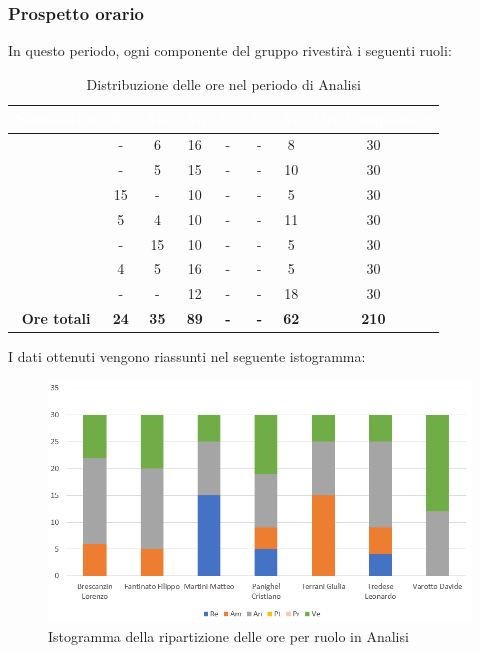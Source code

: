 \subsubsection{Prospetto orario}
In questo periodo, ogni componente del gruppo rivestirà i seguenti ruoli:
\begin{table}[H]
	\begin{center}
		\begin{tabular}{ |c c c c c c c c|}
		\rowcolor{darkblue} 
		\textcolor{white}{\textbf{Nominativo}} & \textcolor{white}{\textbf{Re}} & \textcolor{white}{\textbf{Am}} & \textcolor{white}{\textbf{An}} & \textcolor{white}{\textbf{Pt}} & \textcolor{white}{\textbf{Pr}} & \textcolor{white}{\textbf{Ve}} & \textcolor{white}{\textbf{Ore Complessive}} \\ \hline
		\BL 	& - 	& 6 	& 16 	& - 	& - 	& 8 	& 30 \\ \hline
		\FF 	& - 	& 5 	& 15 	& - 	& - 	& 10 	& 30 \\ \hline
		\MM		& 15	& - 	& 10 	& - 	& - 	& 5 	& 30 \\ \hline
		\PC		& 5 	& 4 	& 10 	& - 	& - 	& 11	& 30 \\ \hline
		\TG 	& - 	& 15	& 10 	& - 	& - 	& 5 	& 30 \\ \hline
		\TL 	& 4 	& 5 	& 16 	& - 	& - 	& 5 	& 30 \\ \hline
		\VD 	& - 	& -  	& 12 	& - 	& - 	& 18 	& 30 \\ \hline
		\textbf{Ore totali} & \textbf{24} & \textbf{35} & \textbf{89} & \textbf{-} & \textbf{-} & \textbf{62} & \textbf{210} \\ \hline
		\end{tabular}
	\caption{Distribuzione delle ore nel periodo di Analisi}
	\end{center}
\end{table}
I dati ottenuti vengono riassunti nel seguente istogramma:
\begin{figure}[H]
    \centering
    \includegraphics[scale = 0.70]{Immagini/AnalisiIsto.png}
    \caption{Istogramma della ripartizione delle ore per ruolo in Analisi}
    \label{fig:istogramma ripartizione ore, periodo di Analisi}
\end{figure}
\newpage
